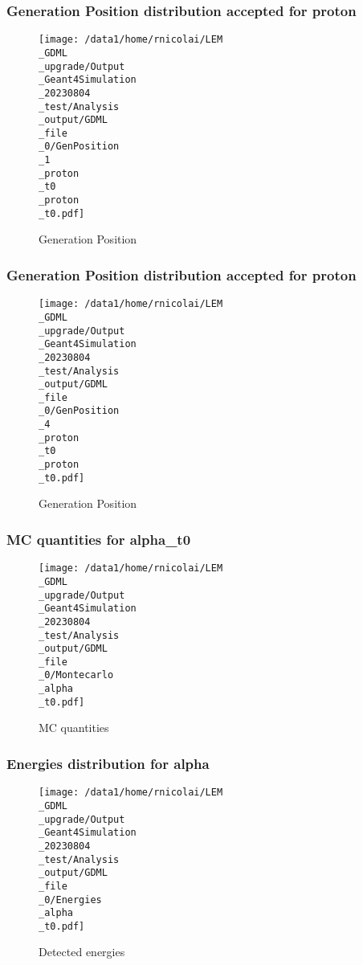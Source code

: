 \documentclass[8pt]{beamer}
\begin{document}
            \begin{frame}
                \frametitle{Generation Position distribution accepted for proton}
            
        \begin{figure}[h]
            \centering
            \texttt{[image: /data1/home/rnicolai/LEM\\\_GDML\\\_upgrade/Output\\\_Geant4Simulation\\\_20230804\\\_test/Analysis\\\_output/GDML\\\_file\\\_0/GenPosition\\\_1\\\_proton\\\_t0\\\_proton\\\_t0.pdf]}
            \caption{Generation Position}
        \end{figure}
        
            \end{frame}
            
            \begin{frame}
                \frametitle{Generation Position distribution accepted for proton}
            
        \begin{figure}[h]
            \centering
            \texttt{[image: /data1/home/rnicolai/LEM\\\_GDML\\\_upgrade/Output\\\_Geant4Simulation\\\_20230804\\\_test/Analysis\\\_output/GDML\\\_file\\\_0/GenPosition\\\_4\\\_proton\\\_t0\\\_proton\\\_t0.pdf]}
            \caption{Generation Position}
        \end{figure}
        
            \end{frame}
            
            \begin{frame}
                \frametitle{MC quantities for alpha\_t0}
            
        \begin{figure}[h]
            \centering
            \texttt{[image: /data1/home/rnicolai/LEM\\\_GDML\\\_upgrade/Output\\\_Geant4Simulation\\\_20230804\\\_test/Analysis\\\_output/GDML\\\_file\\\_0/Montecarlo\\\_alpha\\\_t0.pdf]}
            \caption{MC quantities}
        \end{figure}
        
            \end{frame}
            
            \begin{frame}
                \frametitle{Energies distribution for alpha}
            
        \begin{figure}[h]
            \centering
            \texttt{[image: /data1/home/rnicolai/LEM\\\_GDML\\\_upgrade/Output\\\_Geant4Simulation\\\_20230804\\\_test/Analysis\\\_output/GDML\\\_file\\\_0/Energies\\\_alpha\\\_t0.pdf]}
            \caption{Detected energies}
        \end{figure}
        
            \end{frame}
            
\end{document}
